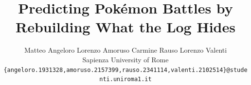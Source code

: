 \documentclass[10pt,twocolumn,letterpaper]{article}
\title{\vspace*{-1.5cm}Predicting Pok\'emon Battles by Rebuilding What the Log Hides}
\author{Matteo Angeloro \quad Lorenzo Amoruso \quad Carmine Rauso \quad Lorenzo Valenti\\
Sapienza University of Rome\\
{\tt\small \{angeloro.1931328,amoruso.2157399,rauso.2341114,valenti.2102514\}@studenti.uniroma1.it}
}
\begin{document}
\maketitle
    



{
    \small
    
    
}
\end{document}
